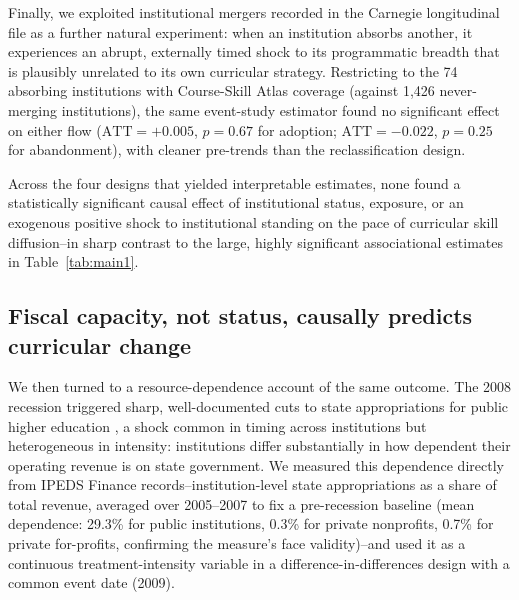 \documentclass[11pt, letterpaper]{article}
\newcommand{\parencite}[1]{\cite{#1}}
\begin{document}
Finally, we exploited institutional mergers recorded in the Carnegie longitudinal file as a further natural experiment: when an institution absorbs another, it experiences an abrupt, externally timed shock to its programmatic breadth that is plausibly unrelated to its own curricular strategy. Restricting to the 74 absorbing institutions with Course-Skill Atlas coverage (against 1,426 never-merging institutions), the same event-study estimator found no significant effect on either flow ($\mathrm{ATT}=+0.005$, $p=0.67$ for adoption; $\mathrm{ATT}=-0.022$, $p=0.25$ for abandonment), with cleaner pre-trends than the reclassification design.

Across the four designs that yielded interpretable estimates, none found a statistically significant causal effect of institutional status, exposure, or an exogenous positive shock to institutional standing on the pace of curricular skill diffusion--in sharp contrast to the large, highly significant associational estimates in Table~\ref{tab:main1}.

\subsection*{Fiscal capacity, not status, causally predicts curricular change}

We then turned to a resource-dependence account of the same outcome. The 2008 recession triggered sharp, well-documented cuts to state appropriations for public higher education \parencite{demingwalters2017}, a shock common in timing across institutions but heterogeneous in intensity: institutions differ substantially in how dependent their operating revenue is on state government. We measured this dependence directly from IPEDS Finance records--institution-level state appropriations as a share of total revenue, averaged over 2005--2007 to fix a pre-recession baseline (mean dependence: 29.3\% for public institutions, 0.3\% for private nonprofits, 0.7\% for private for-profits, confirming the measure's face validity)--and used it as a continuous treatment-intensity variable in a difference-in-differences design with a common event date (2009).

\begin{table}[H]
\centering
\caption{Effect of pre-recession state-funding dependence (standardized, 2005--2007 baseline) interacted with a post-2009 indicator on frontier-skill adoption (Model~1), abandonment (Model~2), and log instructional expenditure (Model~3, public institutions only, nominal, not FTE-normalized). Standard errors clustered by institution in parentheses.}
\label{tab:main2}

\end{table}
\end{document}
